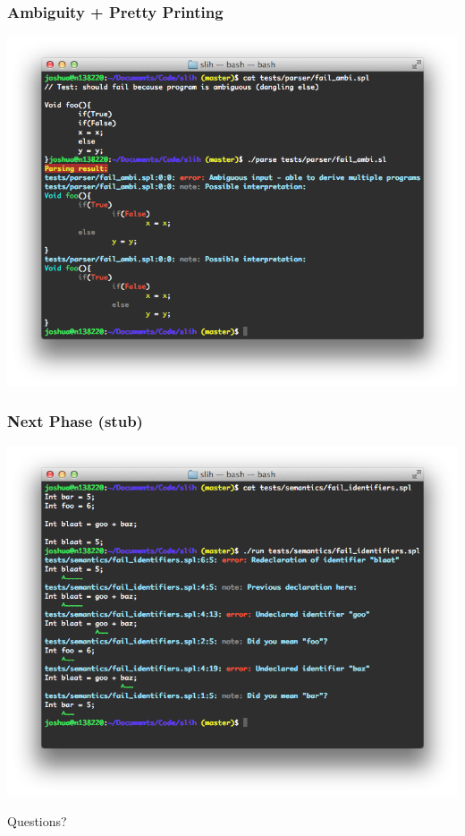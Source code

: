 \documentclass[14pt]{beamer}
\begin{document}
\begin{frame}
\frametitle{Ambiguity + Pretty Printing}
\begin{center}
\includegraphics[width=\textwidth]{ambi_pretty.png}
\end{center}
\end{frame}


\begin{frame}
\frametitle{Next Phase (stub)}
\begin{center}
\includegraphics[width=\textwidth]{next_phase.png}
\end{center}
\end{frame}


\begin{frame}
\begin{center}
\Huge Questions?
\end{center}
\end{frame}
\end{document}
